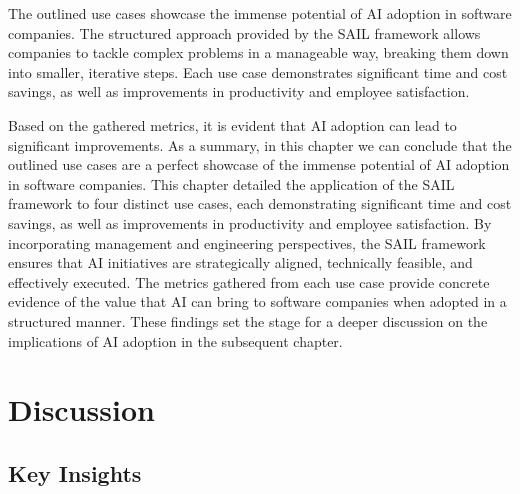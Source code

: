\documentclass[]{imc-inf}
\begin{document}
The outlined use cases showcase the immense potential of AI adoption in software companies. The structured approach provided by the SAIL framework allows companies to tackle complex problems in a manageable way, breaking them down into smaller, iterative steps. Each use case demonstrates significant time and cost savings, as well as improvements in productivity and employee satisfaction.


Based on the gathered metrics, it is evident that AI adoption can lead to significant improvements. 
As a summary, in this chapter we can conclude that the outlined use cases are a perfect showcase of the immense potential of AI adoption in software companies. This chapter detailed the application of the SAIL framework to four distinct use cases, each demonstrating significant time and cost savings, as well as improvements in productivity and employee satisfaction. 
By incorporating management and engineering perspectives, the SAIL framework ensures that AI initiatives are strategically aligned, technically feasible, and effectively executed. The metrics gathered from each use case provide concrete evidence of the value that AI can bring to software companies when adopted in a structured manner. These findings set the stage for a deeper discussion on the implications of AI adoption in the subsequent chapter.


\chapter{Discussion}\label{chapter-7-discussion}

\section{Key Insights}\label{key-insights}
\end{document}
